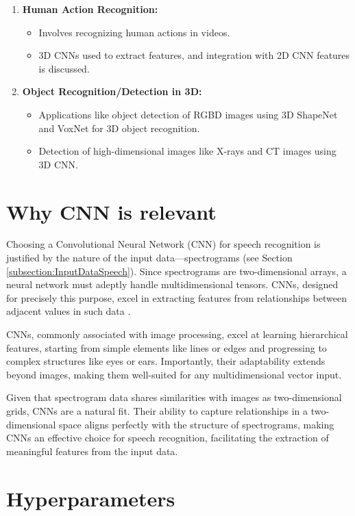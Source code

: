 \begin{enumerate}
	\item \textbf{Human Action Recognition:}
	\begin{itemize}
		\item Involves recognizing human actions in videos.
		\item 3D CNNs used to extract features, and integration with 2D CNN features is discussed.
	\end{itemize}
	
	\item \textbf{Object Recognition/Detection in 3D:}
	\begin{itemize}
		\item Applications like object detection of RGBD images using 3D ShapeNet and VoxNet for 3D object recognition.
		\item Detection of high-dimensional images like X-rays and CT images using 3D CNN.
	\end{itemize}
\end{enumerate}


\section{Why CNN is relevant}

Choosing a Convolutional Neural Network (CNN) for speech recognition is justified by the nature of the input data—spectrograms (see Section \ref{subsection:InputDataSpeech}). Since spectrograms are two-dimensional arrays, a neural network must adeptly handle multidimensional tensors. CNNs, designed for precisely this purpose, excel in extracting features from relationships between adjacent values in such data \cite{Warden:2019}.

CNNs, commonly associated with image processing, excel at learning hierarchical features, starting from simple elements like lines or edges and progressing to complex structures like eyes or ears. Importantly, their adaptability extends beyond images, making them well-suited for any multidimensional vector input.

Given that spectrogram data shares similarities with images as two-dimensional grids, CNNs are a natural fit. Their ability to capture relationships in a two-dimensional space aligns perfectly with the structure of spectrograms, making CNNs an effective choice for speech recognition, facilitating the extraction of meaningful features from the input data.

\section{Hyperparameters}

